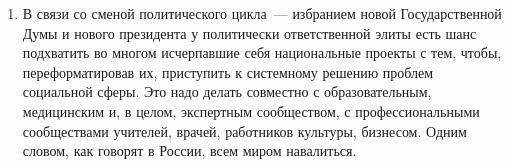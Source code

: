 \documentclass[article, 12pt, russian, oneside]{ncc}
\begin{document}
\begin{enumerate}
\item В связи со сменой политического цикла~--- избранием новой
  Государственной Думы и нового президента у политически ответственной
  элиты есть шанс подхватить во многом исчерпавшие себя национальные
  проекты с тем, чтобы, переформатировав их, приступить к системному
  решению проблем социальной сферы. Это надо делать совместно с
  образовательным, медицинским и, в целом, экспертным сообществом, с
  профессиональными сообществами учителей, врачей, работников
  культуры, бизнесом. Одним словом, как говорят в России, всем миром
  навалиться.
\end{enumerate}


\end{document}
